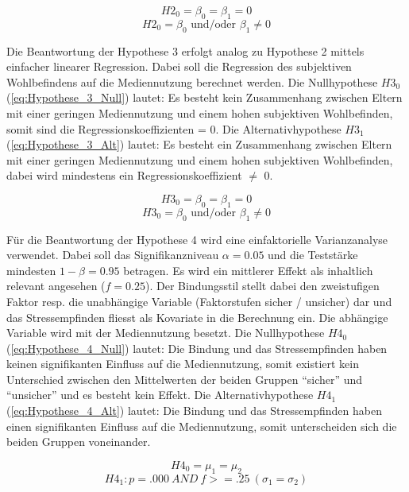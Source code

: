 \begin{equation}\label{eq:Hypothese_2_Null}
    H2_{0} = \beta_0 = \beta_1 = 0
\end{equation}
\begin{equation}\label{eq:Hypothese_2_Alt}
    H2_{0} = \beta_0 \text{ und/oder } \beta_1 \neq 0
\end{equation}

Die Beantwortung der Hypothese 3 erfolgt analog zu Hypothese 2 mittels einfacher linearer Regression. Dabei soll die Regression des subjektiven Wohlbefindens auf die Mediennutzung berechnet werden. Die Nullhypothese $H3_{0}$ (\ref{eq:Hypothese_3_Null}) lautet: Es besteht kein Zusammenhang zwischen Eltern mit einer geringen Mediennutzung und einem hohen subjektiven Wohlbefinden, somit sind die Regressionskoeffizienten = 0. Die Alternativhypothese $H3_{1}$ (\ref{eq:Hypothese_3_Alt}) lautet: Es besteht ein Zusammenhang zwischen Eltern mit einer geringen Mediennutzung und einem hohen subjektiven Wohlbefinden, dabei wird mindestens ein Regressionskoeffizient $\neq$ 0.

\begin{equation}\label{eq:Hypothese_3_Null}
    H3_{0} = \beta_0 = \beta_1 = 0
\end{equation}
\begin{equation}\label{eq:Hypothese_3_Alt}
    H3_{0} = \beta_0 \text{ und/oder } \beta_1 \neq 0
\end{equation}

Für die Beantwortung der Hypothese 4 wird eine einfaktorielle Varianzanalyse verwendet. Dabei soll das Signifikanzniveau $\alpha = 0.05$ und die Teststärke mindesten $1-\beta = 0.95$ betragen. Es wird ein mittlerer Effekt \cite{Cohen1988a} als inhaltlich relevant angesehen ($f = 0.25$). Der Bindungsstil stellt dabei den zweistufigen Faktor resp. die unabhängige Variable (Faktorstufen sicher / unsicher) dar und das Stressempfinden fliesst als Kovariate in die Berechnung ein. Die abhängige Variable wird mit der Mediennutzung besetzt. Die Nullhypothese $H4_{0}$ (\ref{eq:Hypothese_4_Null}) lautet: Die Bindung und das Stressempfinden haben keinen signifikanten Einfluss auf die Mediennutzung, somit existiert kein Unterschied zwischen den Mittelwerten der beiden Gruppen \enquote{sicher} und \enquote{unsicher} und es besteht kein Effekt. Die Alternativhypothese $H4_{1}$ (\ref{eq:Hypothese_4_Alt}) lautet: Die Bindung und das Stressempfinden haben einen signifikanten Einfluss auf die Mediennutzung, somit unterscheiden sich die beiden Gruppen voneinander.

\begin{equation}\label{eq:Hypothese_4_Null}
    H4_{0} = \mu_1 = \mu_2
\end{equation}
\begin{equation}\label{eq:Hypothese_4_Alt}
    H4_{1}:p = .000 ~ AND ~ f >= .25~ (\sigma_1 = \sigma_2)
\end{equation}